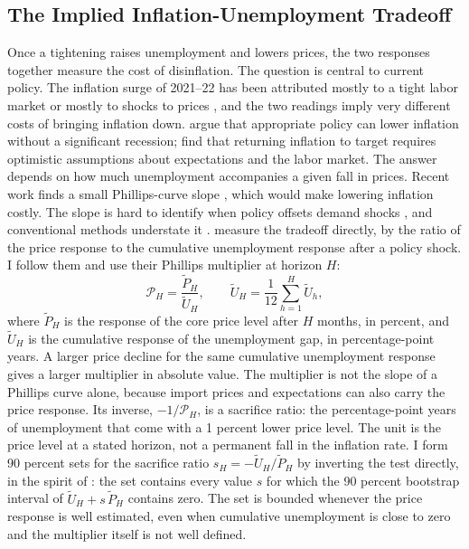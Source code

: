 \documentclass[11pt]{article}
\begin{document}
\subsection{The Implied Inflation-Unemployment Tradeoff}\label{sec:tradeoff}
Once a tightening raises unemployment and lowers prices, the two responses together measure the cost of disinflation. The question is central to current policy. The inflation surge of 2021--22 has been attributed mostly to a tight labor market \citep{benigno2023,ball2022} or mostly to shocks to prices \citep{blanchard2023}, and the two readings imply very different costs of bringing inflation down. \citet{benigno2023} argue that appropriate policy can lower inflation without a significant recession; \citet{ball2022} find that returning inflation to target requires optimistic assumptions about expectations and the labor market. The answer depends on how much unemployment accompanies a given fall in prices. Recent work finds a small Phillips-curve slope \citep{hazell2022,delnegro2020,ball2019,fitzgerald2024}, which would make lowering inflation costly. The slope is hard to identify when policy offsets demand shocks \citep{mcleay2020}, and conventional methods understate it \citep{barnichon2020}. \citet{barnichon2021} measure the tradeoff directly, by the ratio of the price response to the cumulative unemployment response after a policy shock. I follow them and use their Phillips multiplier at horizon $H$:
\begin{equation}
\mathcal{P}_H = \frac{\tilde P_H}{\tilde U_H}, \qquad \tilde U_H=\frac{1}{12}\sum_{h=1}^{H}\tilde U_h, \label{eq:pm}
\end{equation}
where $\tilde P_H$ is the response of the core price level after $H$ months, in percent, and $\tilde U_H$ is the cumulative response of the unemployment gap, in percentage-point years. A larger price decline for the same cumulative unemployment response gives a larger multiplier in absolute value. The multiplier is not the slope of a Phillips curve alone, because import prices and expectations can also carry the price response. Its inverse, $-1/\mathcal{P}_H$, is a sacrifice ratio: the percentage-point years of unemployment that come with a 1 percent lower price level. The unit is the price level at a stated horizon, not a permanent fall in the inflation rate. I form 90 percent sets for the sacrifice ratio $s_H=-\tilde U_H/\tilde P_H$ by inverting the test directly, in the spirit of \citet{anderson1949}: the set contains every value $s$ for which the 90 percent bootstrap interval of $\tilde U_H+s\,\tilde P_H$ contains zero. The set is bounded whenever the price response is well estimated, even when cumulative unemployment is close to zero and the multiplier itself is not well defined.
\end{document}
